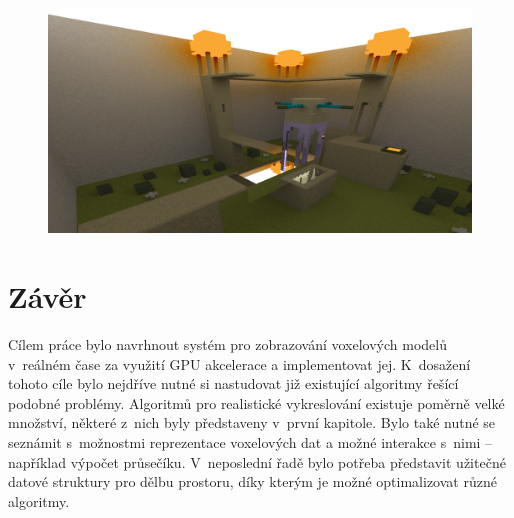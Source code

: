 \begin{figure}[H]
	\centering
	\captionsetup{justification=centering}
	\includegraphics[scale=0.9]{images/indirect_render_2.png}
	\label{fig:indirect_render_2}
\end{figure}


\chapter{Závěr}\label{zaver}
Cílem práce bylo navrhnout systém pro zobrazování voxelových modelů v~reálném čase za využití GPU akcelerace a implementovat jej. K~dosažení tohoto cíle bylo nejdříve nutné si nastudovat již existující algoritmy řešící podobné problémy. Algoritmů pro realistické vykreslování existuje poměrně velké množství, některé z~nich byly představeny v~první kapitole. Bylo také nutné se seznámit s~možnostmi reprezentace voxelových dat a možné interakce s~nimi -- například výpočet průsečíku. V~neposlední řadě bylo potřeba představit užitečné datové struktury pro dělbu prostoru, díky kterým je možné optimalizovat různé algoritmy.

